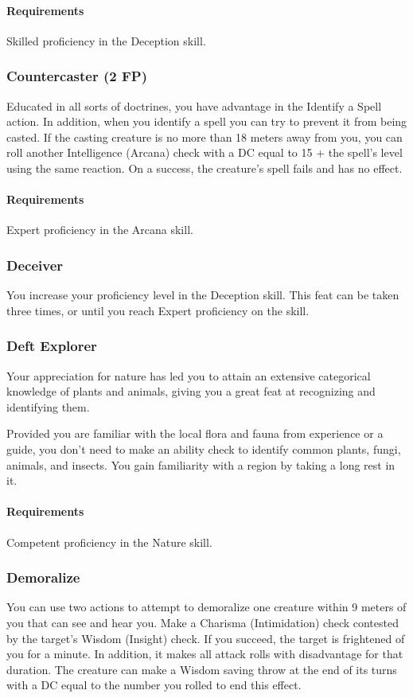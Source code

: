     \paragraph{Requirements} Skilled proficiency in the Deception skill.
\subsubsection{Countercaster (2 FP)} \label{feat::countercaster}
    Educated in all sorts of doctrines, you have advantage in the Identify a Spell action.
    In addition, when you identify a spell you can try to prevent it from being casted.
    If the casting creature is no more than 18 meters away from you, you can roll another Intelligence (Arcana) check with a DC equal to 15 + the spell's level using the same reaction.
    On a success, the creature's spell fails and has no effect.
    \paragraph{Requirements} Expert proficiency in the Arcana skill.
\subsubsection{Deceiver} \label{feat::deceiver}
    You increase your proficiency level in the Deception skill.
    This feat can be taken three times, or until you reach Expert proficiency on the skill.
\subsubsection{Deft Explorer} \label{feat::deftexplorer}
    Your appreciation for nature has led you to attain an extensive categorical knowledge of plants and animals, giving you a great feat at recognizing and identifying them.

    Provided you are familiar with the local flora and fauna from experience or a guide, you don't need to make an ability check to identify common plants, fungi, animals, and insects.
    You gain familiarity with a region by taking a long rest in it.
    \paragraph{Requirements} Competent proficiency in the Nature skill.
\subsubsection{Demoralize} \label{feat::demoralize}
    You can use two actions to attempt to demoralize one creature within 9 meters of you that can see and hear you.
    Make a Charisma (Intimidation) check contested by the target's Wisdom (Insight) check.
    If you succeed, the target is frightened of you for a minute.
    In addition, it makes all attack rolls with disadvantage for that duration.
    The creature can make a Wisdom saving throw at the end of its turns with a DC equal to the number you rolled to end this effect.

